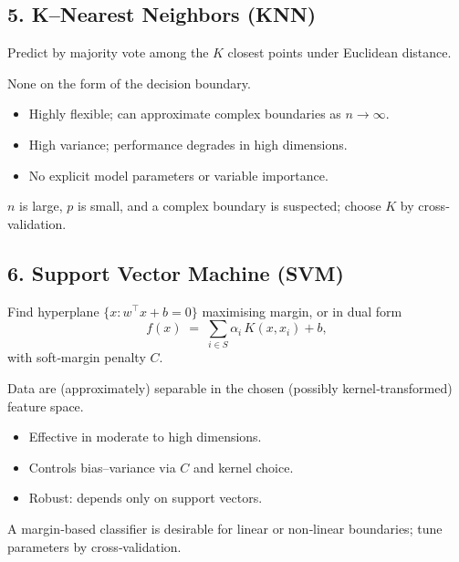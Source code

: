 \documentclass{article}
\begin{document}
\subsection{5. K--Nearest Neighbors (KNN)}
\begin{description}[leftmargin=!,labelwidth=\widthof{\bfseries Form:}]
  \item[Form:]
    Predict by majority vote among the $K$ closest points under Euclidean distance.
  \item[Assumptions:]
    None on the form of the decision boundary.
  \item[Pros:]
    \begin{itemize}[noitemsep]
      \item Highly flexible; can approximate complex boundaries as $n\to\infty$.
    \end{itemize}
  \item[Cons:]
    \begin{itemize}[noitemsep]
      \item High variance; performance degrades in high dimensions.
      \item No explicit model parameters or variable importance.
    \end{itemize}
  \item[Use when:]
    $n$ is large, $p$ is small, and a complex boundary is suspected; choose $K$ by cross‐validation.
\end{description}

\subsection{6. Support Vector Machine (SVM)}
\begin{description}[leftmargin=!,labelwidth=\widthof{\bfseries Form:}]
  \item[Form:]
    Find hyperplane $\{x:w^\top x + b = 0\}$ maximising margin, or in dual form
    \[
      f(x) \;=\; \sum_{i\in S} \alpha_i\,K(x, x_i) + b,
    \]
    with soft‐margin penalty $C$.
  \item[Assumptions:]
    Data are (approximately) separable in the chosen (possibly kernel‐transformed) feature space.
  \item[Pros:]
    \begin{itemize}[noitemsep]
      \item Effective in moderate to high dimensions.
      \item Controls bias–variance via $C$ and kernel choice.
      \item Robust: depends only on support vectors.
    \end{itemize}
  \item[Use when:]
    A margin‐based classifier is desirable for linear or non‐linear boundaries; tune parameters by cross‐validation.
\end{description}
\end{document}

